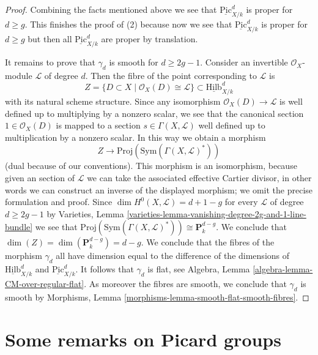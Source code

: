 \documentclass{stacks-project}
\theoremstyle{plain}
\theoremstyle{definition}
\theoremstyle{remark}
\numberwithin{equation}{subsection}
\def\Hilbfunctor{\mathrm{Hilb}}
\def\Picardfunctor{\mathrm{Pic}}
\begin{document}
\begin{proof}
\medskip\noindent
Combining the facts mentioned above we see that
$\underline{\Picardfunctor}^d_{X/k}$ is proper for $d \geq g$.
This finishes the proof of (2) because now we see that
$\underline{\Picardfunctor}^d_{X/k}$ is proper for $d \geq g$ but
then all $\underline{\Picardfunctor}^d_{X/k}$ are proper by translation.

\medskip\noindent
It remains to prove that $\gamma_d$ is smooth for $d \geq 2g - 1$.
Consider an invertible $\mathcal{O}_X$-module $\mathcal{L}$ of degree
$d$. Then the fibre of the point corresponding to $\mathcal{L}$ is
$$
Z = \{D \subset X \mid \mathcal{O}_X(D) \cong \mathcal{L}\} \subset
\underline{\Hilbfunctor}^d_{X/k}
$$
with its natural scheme structure. Since any isomorphism
$\mathcal{O}_X(D) \to \mathcal{L}$ is well defined up
to multiplying by a nonzero scalar, we see that the canonical
section $1 \in \mathcal{O}_X(D)$ is mapped to a section
$s \in \Gamma(X, \mathcal{L})$ well defined up to multiplication
by a nonzero scalar. In this way we obtain a morphism
$$
Z \longrightarrow
\text{Proj}(\text{Sym}(\Gamma(X, \mathcal{L})^*))
$$
(dual because of our conventions). This morphism is an isomorphism,
because given an section of $\mathcal{L}$ we can take the associated
effective Cartier divisor, in other words we can construct an inverse of
the displayed morphism; we omit the precise formulation and proof.
Since $\dim H^0(X, \mathcal{L}) = d + 1 - g$ for every
$\mathcal{L}$ of degree $d \geq 2g - 1$ by
Varieties, Lemma \ref{varieties-lemma-vanishing-degree-2g-and-1-line-bundle}
we see that $\text{Proj}(\text{Sym}(\Gamma(X, \mathcal{L})^*))
\cong \mathbf{P}^{d - g}_k$.
We conclude that $\dim(Z) = \dim(\mathbf{P}^{d - g}_k) = d - g$.
We conclude that the fibres of the morphism $\gamma_d$ all
have dimension equal to the difference of the dimensions of
$\underline{\Hilbfunctor}^d_{X/k}$ and $\underline{\Picardfunctor}^d_{X/k}$.
It follows that $\gamma_d$ is flat, see
Algebra, Lemma \ref{algebra-lemma-CM-over-regular-flat}.
As moreover the fibres are smooth, we conclude that $\gamma_d$
is smooth by Morphisms, Lemma \ref{morphisms-lemma-smooth-flat-smooth-fibres}.
\end{proof}





\section{Some remarks on Picard groups}
\label{section-remarks-picard}
\end{document}
